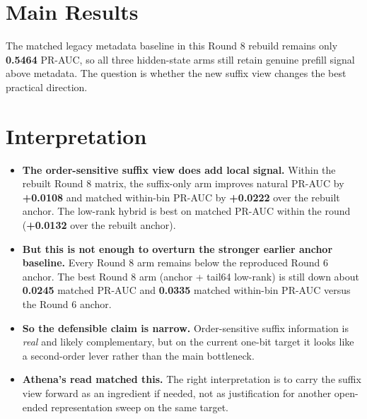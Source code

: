\documentclass[11pt]{article}
\begin{document}
\section*{Main Results}
\begin{center}
\small
\setlength{\tabcolsep}{4pt}
\end{center}

The matched legacy metadata baseline in this Round 8 rebuild remains only \textbf{0.5464} PR-AUC, so all three hidden-state arms still retain genuine prefill signal above metadata. The question is whether the new suffix view changes the best practical direction.

\section*{Interpretation}
\begin{itemize}
  \item \textbf{The order-sensitive suffix view does add local signal.} Within the rebuilt Round 8 matrix, the suffix-only arm improves natural PR-AUC by \textbf{+0.0108} and matched within-bin PR-AUC by \textbf{+0.0222} over the rebuilt anchor. The low-rank hybrid is best on matched PR-AUC within the round (\textbf{+0.0132} over the rebuilt anchor).
  \item \textbf{But this is not enough to overturn the stronger earlier anchor baseline.} Every Round 8 arm remains below the reproduced Round 6 anchor. The best Round 8 arm (anchor + tail64 low-rank) is still down about \textbf{0.0245} matched PR-AUC and \textbf{0.0335} matched within-bin PR-AUC versus the Round 6 anchor.
  \item \textbf{So the defensible claim is narrow.} Order-sensitive suffix information is \emph{real} and likely complementary, but on the current one-bit target it looks like a second-order lever rather than the main bottleneck.
  \item \textbf{Athena's read matched this.} The right interpretation is to carry the suffix view forward as an ingredient if needed, not as justification for another open-ended representation sweep on the same target.
\end{itemize}
\end{document}
